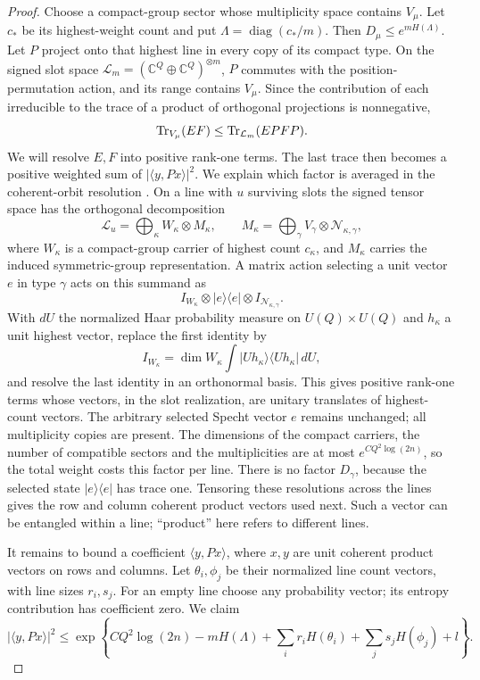 \begin{proof}
Choose a compact-group sector whose multiplicity space contains
$V_\mu$.  Let $c_*$ be its highest-weight count and put
$\Lambda=\operatorname{diag}(c_*/m)$.
Then $D_\mu\le e^{mH(\Lambda)}$.  Let $P$ project onto that highest
line in every copy of its compact type.  On the signed slot space
$\mathcal L_m=(\mathbb C^Q\oplus\mathbb C^Q)^{\otimes m}$,
$P$ commutes with the position-permutation action, and its range
contains $V_\mu$.  Since the contribution of each irreducible to
the trace of a product of orthogonal projections is nonnegative,
\[
 \operatorname{Tr}_{V_\mu}(EF)\le\operatorname{Tr}_{\mathcal L_m}(E P F P).
\]
We will resolve $E,F$ into positive rank-one terms.  The last trace
then becomes a positive weighted sum of $|\langle y,Px\rangle|^2$.
We explain which factor is averaged in the coherent-orbit resolution \cite[Section~2, equations~(7)--(11)]{Perelomov1972}. On a line with $u$ surviving slots the signed tensor space has the orthogonal decomposition
\[
 \mathcal L_u=\bigoplus_\kappa W_\kappa\otimes M_\kappa,
 \qquad
 M_\kappa=\bigoplus_\gamma V_\gamma\otimes\mathcal N_{\kappa,\gamma},
\]
where $W_\kappa$ is a compact-group carrier of highest count $c_\kappa$, and $M_\kappa$ carries the induced symmetric-group representation. A matrix action selecting a unit vector $e$ in type $\gamma$ acts on this summand as
\[
 I_{W_\kappa}\otimes|e\rangle\langle e|
                  \otimes I_{\mathcal N_{\kappa,\gamma}}.
\]
With $dU$ the normalized Haar probability measure on
$U(Q)\times U(Q)$ and $h_\kappa$ a unit highest vector, replace
the first identity by
\[
 I_{W_\kappa}=\dim W_\kappa
       \int|Uh_\kappa\rangle\langle Uh_\kappa|\,dU,
\]
and resolve the last identity in an orthonormal basis. This gives positive rank-one terms whose vectors, in the slot realization, are unitary translates of highest-count vectors. The arbitrary selected Specht vector $e$ remains unchanged; all multiplicity copies are present. The dimensions of the compact carriers, the number of compatible sectors and the multiplicities are at most $e^{CQ^2\log(2n)}$, so the total weight costs this factor per line. There is no factor $D_\gamma$, because the selected state $|e\rangle\langle e|$ has trace one. Tensoring these resolutions across the lines gives the row and column coherent product vectors used next. Such a vector can be entangled within a line; ``product'' here refers to different lines.

It remains to bound a coefficient $\langle y,Px\rangle$, where
$x,y$ are unit coherent product vectors on rows and columns.  Let
$\theta_i,\phi_j$ be their normalized line count vectors, with line
sizes $r_i,s_j$.  For an empty line choose any probability vector;
its entropy contribution has coefficient zero.  We claim
\begin{equation}\label{rec:coherent-coefficient}
 |\langle y,Px\rangle|^2
 \le\exp\left\{CQ^2\log(2n)-mH(\Lambda)
          +\sum_ir_iH(\theta_i)+\sum_js_jH(\phi_j)+l\right\}.
\end{equation}


\end{proof}
